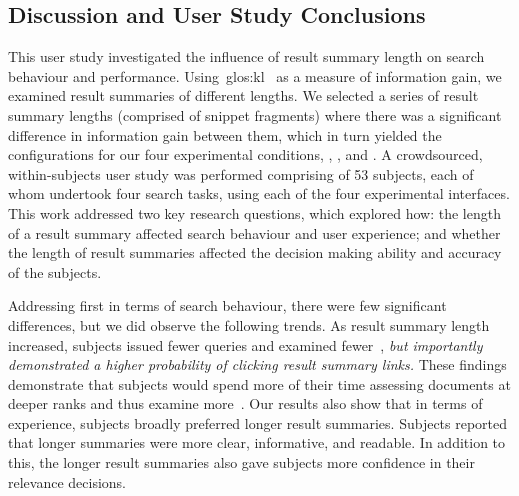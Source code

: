 \subsection{Discussion and User Study Conclusions}\label{chap:snippets:user:discussion}
This user study investigated the influence of result summary length on search behaviour and performance. Using~\gls{glos:kl}~\citep{kullback1951information} as a measure of information gain, we examined result summaries of different lengths. We selected a series of result summary lengths (comprised of snippet fragments) where there was a significant difference in information gain between them, which in turn yielded the configurations for our four experimental conditions, , ,  and . A crowdsourced, within-subjects user study was performed comprising of 53 subjects, each of whom undertook four search tasks, using each of the four experimental interfaces. This work addressed two key research questions, which explored how:  the length of a result summary affected search behaviour and user experience; and  whether the length of result summaries affected the decision making ability and accuracy of the subjects.

Addressing  first in terms of search behaviour, there were few significant differences, but we did observe the following trends. As result summary length increased, subjects issued fewer queries and examined fewer~, \emph{but importantly demonstrated a higher probability of clicking result summary links.} These findings demonstrate that subjects would spend more of their time assessing documents at deeper ranks and thus examine more~. Our results also show that in terms of experience, subjects broadly preferred longer result summaries. Subjects reported that longer summaries were more clear, informative, and readable. In addition to this, the longer result summaries also gave subjects more confidence in their relevance decisions.

